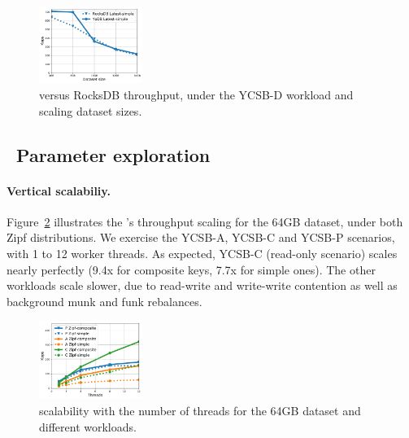 \begin{figure}[t]
\centering
\includegraphics[width=0.3\textwidth]{figs/Workload_D_line.pdf}
\caption{{\sys\/ versus RocksDB throughput, under the YCSB-D workload and scaling dataset sizes.}}
\label{fig:throughput:d}
\end{figure}


\subsection{\sys\ Parameter exploration}
\label{ssec:drill} 

\paragraph{Vertical scalabiliy.} 
Figure~\ref{fig:scalability} illustrates the \sys's throughput scaling for the 64GB dataset, under both Zipf  
distributions. We exercise the YCSB-A, YCSB-C and YCSB-P scenarios, with 1 to 12 worker threads.  
As expected, YCSB-C (read-only scenario) scales nearly perfectly (9.4x for composite keys, 7.7x for simple ones). 
The other workloads scale slower, due to read-write and write-write contention as well as background munk and funk rebalances. 

\begin{figure}[th]
\centering
\includegraphics[width=0.3\textwidth]{figs/scalability_line.pdf}
\caption{{\sys\/ scalability with the number of threads for 
the 64GB dataset and different workloads. }}
\label{fig:scalability}
\end{figure}

